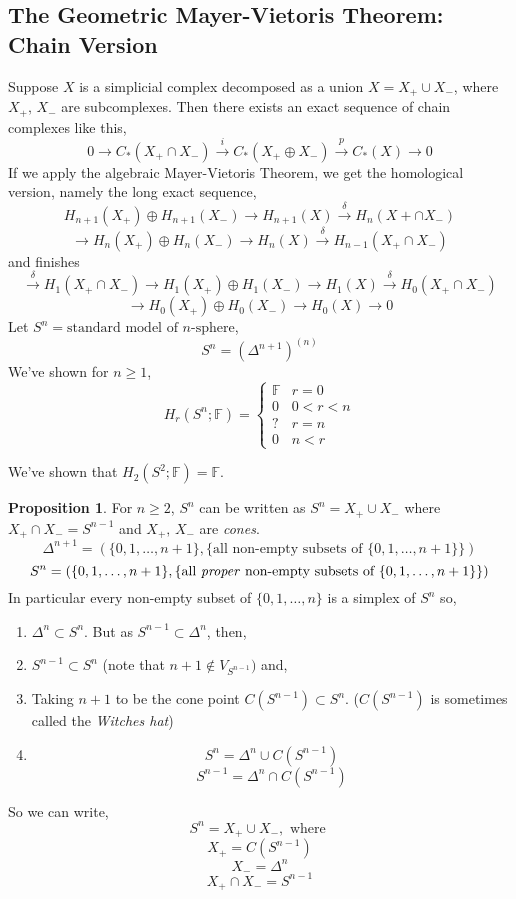 \documentclass[a4paper,14pt]{extarticle}
\theoremstyle{definition}
\newtheorem*{proposition}{Proposition}
\begin{document}
\subsection{The Geometric Mayer-Vietoris Theorem: Chain Version}
Suppose $X$ is a simplicial complex decomposed as a union $X=X_+\cup X_-$,
where $X_+, \,X_-$ are subcomplexes. Then there exists an exact sequence
of chain complexes like this,
\[0\rightarrow C_*(X_+\cap X_-)\xrightarrow{i} C_*(X_+\oplus X_-)
\xrightarrow{p} C_*(X)\rightarrow 0\]
If we apply the algebraic Mayer-Vietoris Theorem, we get the homological version,
namely the long exact sequence,
\[H_{n+1}(X_+)\oplus H_{n+1}(X_-)\rightarrow H_{n+1}(X)\xrightarrow{\delta}
H_n(X+\cap X_-)\] \[\rightarrow H_n(X_+)\oplus H_n(X_-)\rightarrow H_n(X)
\xrightarrow{\delta} H_{n-1}(X_+\cap X_-)\]
and finishes
\[\xrightarrow{\delta} H_1(X_+\cap X_-)\rightarrow H_1(X_+)\oplus H_1(X_-)
\rightarrow H_1(X)\xrightarrow{\delta} H_0(X_+\cap X_-)\] 
\[\rightarrow H_0(X_+)\oplus H_0(X_-)\rightarrow H_0(X)\rightarrow 0 \]
Let $S^n=\text{standard model of $n$-sphere}$,
\[S^n=(\Delta^{n+1})^{(n)}\] We've shown for $n\geq1$,
\[H_r(S^n;\mathbb{F})=\begin{cases}
	\mathbb{F} & r=0 \\ 0 & 0<r<n \\ ? & r=n \\ 0 & n < r
\end{cases}\]

We've shown that $H_2(S^2;\mathbb{F})=\mathbb{F}$.

\begin{proposition}
	For $n\geq 2$, $S^n$ can be written as $S^n=X_+\cup X_-$ where
	$X_+\cap X_-=S^{n-1}$ and $X_+, \,X_-$ are \emph{cones}.
	\[\Delta^{n+1}=(\{0,1,\ldots,n+1\},\{\text{all non-empty subsets of
	$\{0,1,\ldots,n+1\}$}\})\]
	\[S^n=(\{0,1,\ldots,n+1\},\{\text{all \emph{proper} non-empty subsets of
	$\{0,1,\ldots,n+1\}$}\})\]
	In particular every non-empty subset of $\{0,1,\ldots,n\}$ is a simplex
	of $S^n$ so,
	\begin{enumerate}
		\item $\Delta^n\subset S^n$. But as $S^{n-1}\subset \Delta^n$, then,
		\item $S^{n-1}\subset S^n$ (note that $n+1\not\in V_{S^{n-1}})$ and,
		\item Taking $n+1$ to be the cone point $C(S^{n-1})\subset S^n$. 
				($C(S^{n-1})$ is sometimes called the \emph{Witches hat})
		\item
		\[S^n=\Delta^n\cup C(S^{n-1})\] \[S^{n-1}=\Delta^n\cap C(S^{n-1})\]
	\end{enumerate}

		So we can write,
		\[S^n=X_+\cup X_-,\text{ where }\]
		\[X_+=C(S^{n-1})\]
		\[X_-=\Delta^n\]
		\[X_+\cap X_- = S^{n-1}\]
\end{proposition}
\end{document}

